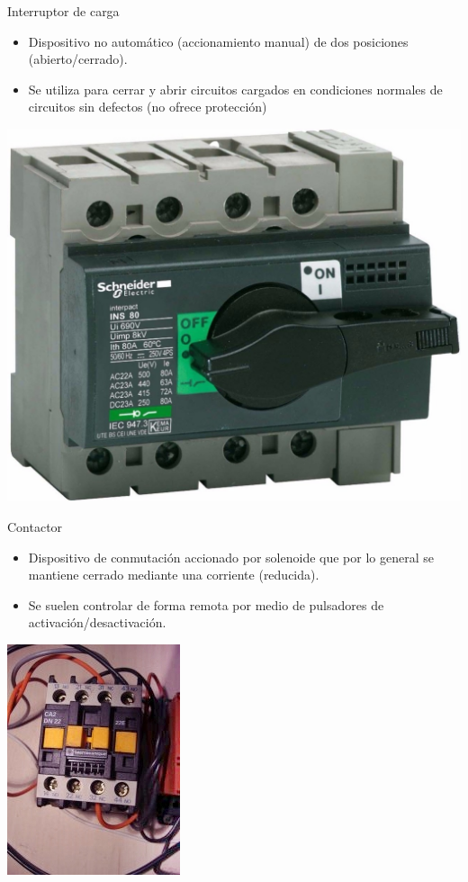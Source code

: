 \documentclass[xcolor={usenames,svgnames,dvipsnames}]{beamer}
\begin{document}
\begin{frame}[label={sec:org9eaf70d}]{Interruptor de carga}
\begin{itemize}
\item Dispositivo no automático (\alert{accionamiento manual}) de dos posiciones (abierto/cerrado).

\item Se utiliza para cerrar y abrir circuitos cargados en condiciones normales de circuitos sin defectos (no ofrece protección)
\end{itemize}
\begin{center}
\includegraphics[height=0.6\textheight]{../figs/interruptor_manual.jpg}
\end{center}
\end{frame}


\begin{frame}[label={sec:org3474b73}]{Contactor}
\begin{itemize}
\item Dispositivo de conmutación accionado por solenoide que por lo general se mantiene cerrado mediante una corriente (reducida).

\item Se suelen controlar de forma remota por medio de pulsadores de activación/desactivación.
\end{itemize}

\begin{center}
\includegraphics[height=0.6\textheight]{../figs/Contactor.jpg}
\end{center}
\end{frame}
\end{document}
